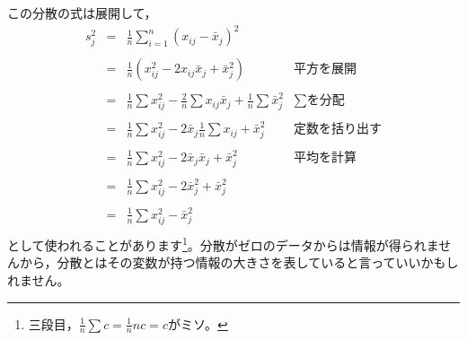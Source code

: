 \documentclass{ltjsbook}
\begin{document}
この分散の式は展開して，
\[
	\begin{array}{lllr}
		s_j^2 & = & \frac{1}{n}\sum_{i=1}^n (x_{ij} - \bar{x}_j)^2                                               &                  \\
		      &   &                                                                                                                 \\
		      & = & \frac{1}{n} (x_{ij}^2 - 2x_{ij} \bar{x}_j + \bar{x}_j^2)                                     & \text{平方を展開}     \\
		      &   &                                                                                                                 \\
		      & = & \frac{1}{n} \sum x_{ij}^2 - \frac{2}{n} \sum x_{ij} \bar{x}_j + \frac{1}{n} \sum \bar{x}_j^2 & \text{$\sum$を分配} \\
		      &   &                                                                                                                 \\
		      & = & \frac{1}{n} \sum x_{ij}^2 - 2\bar{x}_j\frac{1}{n} \sum x_{ij} + \bar{x}_j^2                  & \text{定数を括り出す}   \\
		      &   &                                                                                                                 \\
		      & = & \frac{1}{n} \sum x_{ij}^2 - 2\bar{x}_j\bar{x}_j + \bar{x}_j^2                                & \text{平均を計算}     \\
		      &   &                                                                                                                 \\
		      & = & \frac{1}{n} \sum x_{ij}^2 - 2\bar{x}_j^2 + \bar{x}_j^2                                       &                  \\
		      &   &                                                                                                                 \\
		      & = & \frac{1}{n} \sum x_{ij}^2 -  \bar{x}_j^2                                                     &                  \\
	\end{array}
\]
として使われることがあります\footnote{三段目，$\frac{1}{n}\sum c = \frac{1}{n} nc = c$がミソ。}。分散がゼロのデータからは情報が得られませんから，分散とはその変数が持つ情報の大きさを表していると言っていいかもしれません。
\end{document}

